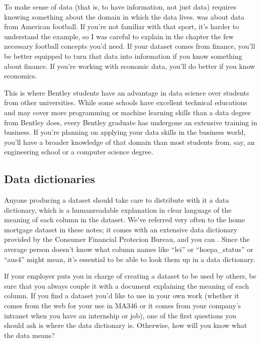 \documentclass[letterpaper,10pt,english]{jupyterBook}
\begin{document}
\sphinxAtStartPar
To make sense of data (that is, to have information, not just data) requires knowing something about the domain in which the data lives.   was about data from American football.  If you’re not familiar with that sport, it’s harder to understand the example, so I was careful to explain in the chapter the few necessary football concepts you’d need.  If your dataset comes from finance, you’ll be better equipped to turn that data into information if you know something about finance.  If you’re working with economic data, you’ll do better if you know economics.

\sphinxAtStartPar
This is where Bentley students have an advantage in data science over students from other universities.  While some schools have excellent technical educations and may cover more programming or machine learning skills than a data degree from Bentley does, every Bentley graduate has undergone an extensive training in business.  If you’re planning on applying your data skills in the business world, you’ll have a broader knowledge of that domain than most students from, say, an engineering school or a computer science degree.


\subsection{Data dictionaries}
\label{\detokenize{chapter-13-etl:data-dictionaries}}
\sphinxAtStartPar
Anyone producing a dataset should take care to distribute with it a data dictionary, which is a human\sphinxhyphen{}readable explanation in clear language of the meaning of each column in the dataset.  We’ve referred very often to the home mortgage dataset in these notes; it comes with an extensive data dictionary provided by the Consumer Financial Protecion Bureau, and you can .  Since the average person doesn’t know what column names like “lei” or “hoepa\_status” or “aus\sphinxhyphen{}4” might mean, it’s essential to be able to look them up in a data dictionary.

\sphinxAtStartPar
If your employer puts you in charge of creating a dataset to be used by others, be sure that you always couple it with a document explaining the meaning of each column.  If you find a dataset you’d like to use in your own work (whether it comes from the web for your use in MA346 or it comes from your company’s intranet when you have an internship or job), one of the first questions you should ask is where the data dictionary is.  Otherwise, how will you know what the data means?
\end{document}

